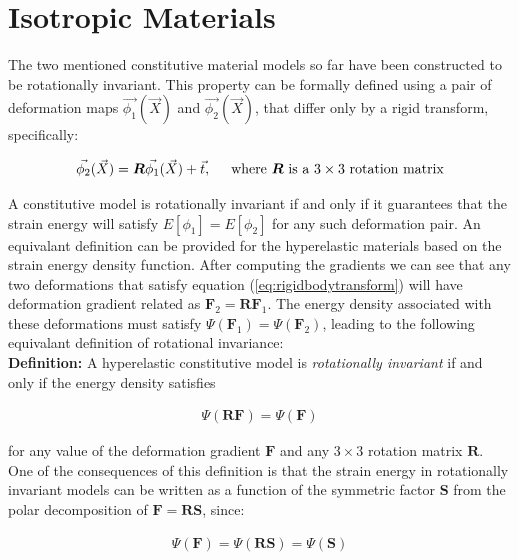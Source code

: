 \section{Isotropic Materials}
The two mentioned constitutive material models so far have been constructed to be rotationally invariant. This property can be formally defined using a pair of 
deformation maps $\vec{\phi_1}(\vec{X})$ and $\vec{\phi_2}(\vec{X})$, that differ only by a rigid transform, specifically:

\begin{equation}
\label{eq:rigidbodytransform}
 \vec{\phi_2}(\vec{X}) = \boldsymbol{R} \vec{\phi_1}(\vec{X}) + \vec{t}, \hspace{5mm} \text{where $\boldsymbol{R}$ is a $3\times 3$ rotation matrix}
\end{equation}

A constitutive model is rotationally invariant if and only if it guarantees that the strain energy will satisfy $E\left[ \phi_1 \right] = E\left[ \phi_2 \right]$
for any such deformation pair. An equivalant definition can be provided for the hyperelastic materials based on the strain energy density function. 
After computing the gradients we can see that any two deformations that satisfy equation (\ref{eq:rigidbodytransform}) will have deformation gradient related as
$\boldsymbol{F}_2=\boldsymbol{R}\boldsymbol{F}_1$. The energy density associated with these deformations must satisfy $\Psi(\boldsymbol{F}_1)=\Psi(\boldsymbol{F}_2)$,
leading to the following equivalant definition of rotational invariance:\\

\textbf{Definition:} A hyperelastic constitutive model is \textit{rotationally invariant} if and only if the energy density satisfies

\begin{gather*}
  \Psi(\boldsymbol{RF})=\Psi(\boldsymbol{F})
\end{gather*}

for any value of the deformation gradient $\boldsymbol{F}$ and any $3 \times 3 $ rotation matrix $\boldsymbol{R}$.
One of the consequences of this definition is that the strain energy in rotationally invariant models can be written
as a function of the symmetric factor $\boldsymbol{S}$ from the polar decomposition of $\boldsymbol{F} = \boldsymbol{RS}$, since:

\begin{gather*}
  \Psi(\boldsymbol{F}) = \Psi(\boldsymbol{RS}) = \Psi(\boldsymbol{S})
\end{gather*}


